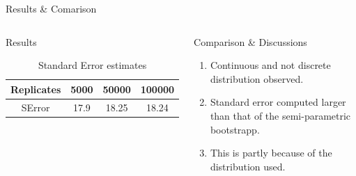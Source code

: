 \documentclass[a4paper,9pt]{beamer}\usepackage[]{graphicx}\usepackage[]{color}
\begin{document}
\begin{frame}{Results \& Comarison}


\begin{columns}
\begin{block}{Results}
\begin{table}[h]
\begin{tabular}{cccc}
\hline
Replicates & 5000 & 50000 & 100000\\ 
\hline
SError & 17.9 & 18.25 & 18.24\\
\hline
\end{tabular}
\caption{Standard Error estimates}
\end{table}
\end{block}

\begin{block}{Comparison \& Discussions}
\begin{enumerate}[i]
\item Continuous and not discrete distribution observed.
\item Standard error computed larger than that of the semi-parametric bootstrapp.
\item This is partly because of the distribution used.
\end{enumerate}
\end{block}
\end{columns}
\end{frame}
\end{document}
